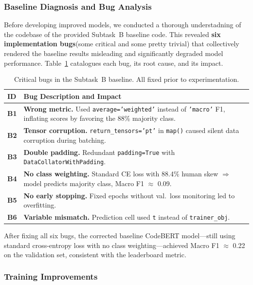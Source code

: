 \documentclass[11pt]{article}
\begin{document}
\subsubsection{Baseline Diagnosis and Bug Analysis}
\label{sec:taskB_diagnosis}

Before developing improved models, we conducted a thorough understadning of the codebase of the provided Subtask~B baseline code. This revealed \textbf{six implementation bugs}(some critical and some pretty trivial) that collectively rendered the baseline results misleading and significantly degraded model performance. Table~\ref{tab:taskB_bugs} catalogues each bug, its root cause, and its impact.

\begin{table}[htbp]
\centering
\footnotesize
\begin{tabularx}{\columnwidth}{@{}l X@{}}
\toprule
\textbf{ID} & \textbf{Bug Description and Impact} \\ \midrule
\textbf{B1} & \textbf{Wrong metric.} Used \texttt{average='weighted'} instead of \texttt{'macro'} F1, inflating scores by favoring the 88\% majority class. \\
\textbf{B2} & \textbf{Tensor corruption.} \texttt{return\_tensors='pt'} in \texttt{map()} caused silent data corruption during batching. \\
\textbf{B3} & \textbf{Double padding.} Redundant \texttt{padding=True} with \texttt{DataCollatorWithPadding}. \\
\textbf{B4} & \textbf{No class weighting.} Standard CE loss with 88.4\% human skew $\Rightarrow$ model predicts majority class, Macro F1 $\approx$ 0.09. \\
\textbf{B5} & \textbf{No early stopping.} Fixed epochs without val.\ loss monitoring led to overfitting. \\
\textbf{B6} & \textbf{Variable mismatch.} Prediction cell used \texttt{t} instead of \texttt{trainer\_obj}. \\
\bottomrule
\end{tabularx}
\caption{Critical bugs in the Subtask~B baseline. All fixed prior to experimentation.}
\label{tab:taskB_bugs}
\end{table}

After fixing all six bugs, the corrected baseline CodeBERT model---still using standard cross-entropy loss with no class weighting---achieved Macro F1 $\approx$ 0.22 on the validation set, consistent with the leaderboard metric. 

\subsubsection{Training Improvements}
\label{sec:taskB_improvements}
\end{document}
